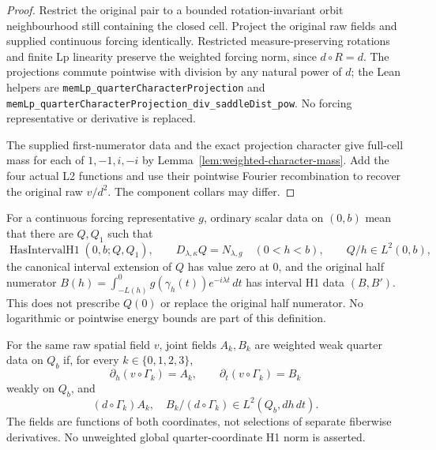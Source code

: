 \begin{proof}
\leanok
Restrict the original pair to a bounded rotation-invariant orbit
neighbourhood still containing the closed cell.
Project the original raw fields and supplied continuous forcing identically.
Restricted measure-preserving rotations and finite Lp linearity preserve
the weighted forcing norm, since $d\circ R=d$.
The projections commute pointwise with division by any natural power of $d$;
the Lean helpers are \texttt{memLp\_quarterCharacterProjection} and
\texttt{memLp\_quarterCharacterProjection\_div\_saddleDist\_pow}.
No forcing representative or derivative is replaced.

The supplied first-numerator data and the exact projection character give
full-cell mass for each of $1,-1,i,-i$ by
Lemma~\ref{lem:weighted-character-mass}.
Add the four actual L2 functions and use their pointwise Fourier
recombination to recover the original raw $v/d^2$.
The component collars may differ.
\end{proof}

\begin{definition}
\label{def:quarter-h1-scalar-data}
\leanok
For a continuous forcing representative $g$, ordinary scalar data on $(0,b)$
mean that there are $Q,Q_1$ such that
\[
 \operatorname{HasIntervalH1}(0,b;Q,Q_1),\qquad
 D_{\lambda,\kappa}Q=N_{\lambda,g}\quad(0<h<b),\qquad Q/h\in L^2(0,b),
\]
the canonical interval extension of $Q$ has value zero at $0$, and the
original half numerator
$B(h)=\int_{-L(h)}^0g(\gamma_h(t))e^{-i\lambda t}\,dt$
has interval H1 data $(B,B')$.
This does not prescribe $Q(0)$ or replace the original half numerator.
No logarithmic or pointwise energy bounds are part of this definition.
\end{definition}

\begin{definition}
\label{def:weighted-quarter-derivative-data}
\leanok
For the same raw spatial field $v$, joint fields $A_k,B_k$ are weighted
weak quarter data on $Q_b$ if, for every $k\in\{0,1,2,3\}$,
\[
 \partial_h(v\circ\Gamma_k)=A_k,\qquad
 \partial_t(v\circ\Gamma_k)=B_k
\]
weakly on $Q_b$, and
\[
 (d\circ\Gamma_k)A_k,\quad B_k/(d\circ\Gamma_k)\in L^2(Q_b,dh\,dt).
\]
The fields are functions of both coordinates, not selections of separate
fiberwise derivatives. No unweighted global quarter-coordinate H1 norm is asserted.
\end{definition}

